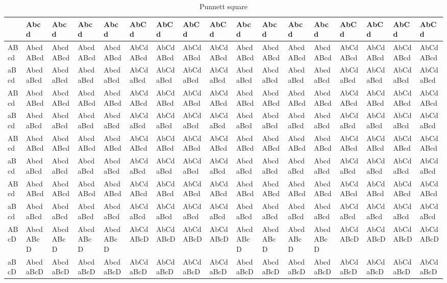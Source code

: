 \documentclass{article}
\begin{document}
\begin{table}[]
\centering
\caption{Punnett square}
\label{punnettsquare}
\begin{tabular}{l|llllllllllllllll}
\hline
& Abcd & Abcd & Abcd & Abcd & AbCd & AbCd & AbCd & AbCd & Abcd & Abcd & Abcd & Abcd & AbCd & AbCd & AbCd & AbCd \\ 
\hline
ABcd & AbcdABcd & AbcdABcd & AbcdABcd & AbcdABcd & AbCdABcd & AbCdABcd & AbCdABcd & AbCdABcd & AbcdABcd & AbcdABcd & AbcdABcd & AbcdABcd & AbCdABcd & AbCdABcd & AbCdABcd & AbCdABcd \\ 
aBcd & AbcdaBcd & AbcdaBcd & AbcdaBcd & AbcdaBcd & AbCdaBcd & AbCdaBcd & AbCdaBcd & AbCdaBcd & AbcdaBcd & AbcdaBcd & AbcdaBcd & AbcdaBcd & AbCdaBcd & AbCdaBcd & AbCdaBcd & AbCdaBcd \\ 
ABcd & AbcdABcd & AbcdABcd & AbcdABcd & AbcdABcd & AbCdABcd & AbCdABcd & AbCdABcd & AbCdABcd & AbcdABcd & AbcdABcd & AbcdABcd & AbcdABcd & AbCdABcd & AbCdABcd & AbCdABcd & AbCdABcd \\ 
aBcd & AbcdaBcd & AbcdaBcd & AbcdaBcd & AbcdaBcd & AbCdaBcd & AbCdaBcd & AbCdaBcd & AbCdaBcd & AbcdaBcd & AbcdaBcd & AbcdaBcd & AbcdaBcd & AbCdaBcd & AbCdaBcd & AbCdaBcd & AbCdaBcd \\ 
ABcd & AbcdABcd & AbcdABcd & AbcdABcd & AbcdABcd & AbCdABcd & AbCdABcd & AbCdABcd & AbCdABcd & AbcdABcd & AbcdABcd & AbcdABcd & AbcdABcd & AbCdABcd & AbCdABcd & AbCdABcd & AbCdABcd \\ 
aBcd & AbcdaBcd & AbcdaBcd & AbcdaBcd & AbcdaBcd & AbCdaBcd & AbCdaBcd & AbCdaBcd & AbCdaBcd & AbcdaBcd & AbcdaBcd & AbcdaBcd & AbcdaBcd & AbCdaBcd & AbCdaBcd & AbCdaBcd & AbCdaBcd \\ 
ABcd & AbcdABcd & AbcdABcd & AbcdABcd & AbcdABcd & AbCdABcd & AbCdABcd & AbCdABcd & AbCdABcd & AbcdABcd & AbcdABcd & AbcdABcd & AbcdABcd & AbCdABcd & AbCdABcd & AbCdABcd & AbCdABcd \\ 
aBcd & AbcdaBcd & AbcdaBcd & AbcdaBcd & AbcdaBcd & AbCdaBcd & AbCdaBcd & AbCdaBcd & AbCdaBcd & AbcdaBcd & AbcdaBcd & AbcdaBcd & AbcdaBcd & AbCdaBcd & AbCdaBcd & AbCdaBcd & AbCdaBcd \\ 
ABcD & AbcdABcD & AbcdABcD & AbcdABcD & AbcdABcD & AbCdABcD & AbCdABcD & AbCdABcD & AbCdABcD & AbcdABcD & AbcdABcD & AbcdABcD & AbcdABcD & AbCdABcD & AbCdABcD & AbCdABcD & AbCdABcD \\ 
aBcD & AbcdaBcD & AbcdaBcD & AbcdaBcD & AbcdaBcD & AbCdaBcD & AbCdaBcD & AbCdaBcD & AbCdaBcD & AbcdaBcD & AbcdaBcD & AbcdaBcD & AbcdaBcD & AbCdaBcD & AbCdaBcD & AbCdaBcD & AbCdaBcD \\ 

\end{tabular}
\end{table}
\end{document}
